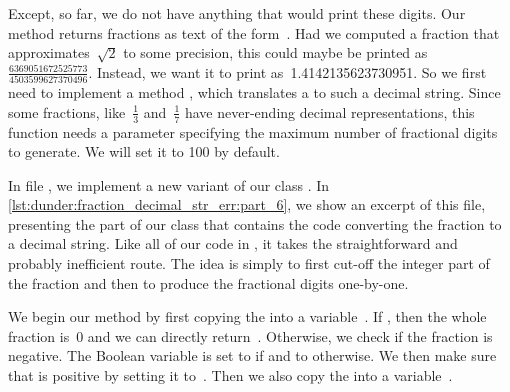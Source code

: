 Except, so far, we do not have anything that would print these digits.
Our  method returns fractions as text of the form~.
Had we computed a fraction that approximates~$\sqrt{2}$ to some precision, this could maybe be printed as~$\frac{6369051672525773}{4503599627370496}$.
Instead, we want it to print as~1.4142135623730951.
So we first need to implement a method , which translates a  to such a decimal string.
Since some fractions, like~$\frac{1}{3}$ and~$\frac{1}{7}$ have never-ending decimal representations, this function needs a parameter  specifying the maximum number of fractional digits to generate.
We will set it to 100 by default.

%
%

In file , we implement a new variant of our class .
In \cref{lst:dunder:fraction_decimal_str_err:part_6}, we show an excerpt of this file, presenting the part of our class  that contains the code converting the fraction to a decimal string.
Like all of our code in , it takes the straightforward and probably inefficient route.
The idea is simply to first cut-off the integer part of the fraction and then to produce the fractional digits one-by-one.

We begin our method  by first copying the  into a variable~.
If , then the whole fraction is~0 and we can directly return~.
Otherwise, we check if the fraction is negative.
The Boolean variable  is set to  if  and to  otherwise.
We then make sure that  is positive by setting it to~.
Then we also copy the  into a variable~.

